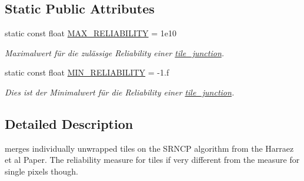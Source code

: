 \subsection*{Static Public Attributes}
\begin{DoxyCompactItemize}
\item 
\hypertarget{classsrncp__tile__merger_a0b4798100171731235ff96a6432e34ad}{static const float \hyperlink{classsrncp__tile__merger_a0b4798100171731235ff96a6432e34ad}{M\-A\-X\-\_\-\-R\-E\-L\-I\-A\-B\-I\-L\-I\-T\-Y} = 1e10}\label{classsrncp__tile__merger_a0b4798100171731235ff96a6432e34ad}

\begin{DoxyCompactList}\small\item\em Maximalwert für die zulässige Reliability einer \hyperlink{classtile__junction}{tile\-\_\-junction}. \end{DoxyCompactList}\item 
\hypertarget{classsrncp__tile__merger_a72d96c0293af6a4abab6ee7e9f57678f}{static const float \hyperlink{classsrncp__tile__merger_a72d96c0293af6a4abab6ee7e9f57678f}{M\-I\-N\-\_\-\-R\-E\-L\-I\-A\-B\-I\-L\-I\-T\-Y} = -\/1.f}\label{classsrncp__tile__merger_a72d96c0293af6a4abab6ee7e9f57678f}

\begin{DoxyCompactList}\small\item\em Dies ist der Minimalwert für die Reliability einer \hyperlink{classtile__junction}{tile\-\_\-junction}. \end{DoxyCompactList}\end{DoxyCompactItemize}


\subsection{Detailed Description}
merges individually unwrapped tiles on the S\-R\-N\-C\-P algorithm from the Harraez et al Paper. The reliability measure for tiles if very different from the measure for single pixels though. 

